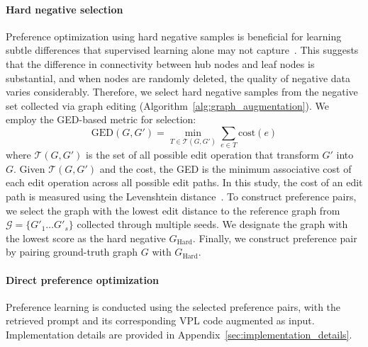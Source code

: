 \paragraph{Hard negative selection}
Preference optimization using hard negative samples is beneficial for learning subtle differences that supervised learning alone may not capture~\cite{zhu2024selfsupervised, chen2024on}.
This suggests that the difference in connectivity between hub nodes and leaf nodes is substantial, and when nodes are randomly deleted, the quality of negative data varies considerably.
Therefore, we select hard negative samples from the negative set collected via graph editing (Algorithm~\ref{alg:graph_augmentation}). We employ the GED-based metric for selection:
\begin{equation}
    \text{GED}(G,G')=\min_{T\in\mathcal{T}(G,G')}\sum\limits_{e \in T}\text{cost}(e)
\end{equation}
where $\mathcal{T}(G,G')$ is the set of all possible edit operation that transform $G'$ into $G$. Given $\mathcal{T}(G,G')$ and the cost, the GED is the minimum associative cost of each edit operation across all possible edit paths. In this study, the cost of an edit path is measured using the Levenshtein distance~\citep{black1998dictionary}. To construct preference pairs, we select the graph with the lowest edit distance to the reference graph from $\mathcal{G}=\{G'_1\dots G'_s\}$ collected through multiple seeds. We designate the graph with the lowest score as the hard negative $G_{\text{Hard}}$. Finally, we construct preference pair by pairing ground-truth graph $G$ with $G_{\text{Hard}}$. 

\paragraph{Direct preference optimization}
Preference learning is conducted using the selected preference pairs, with the retrieved prompt and its corresponding VPL code augmented as input. Implementation details are provided in Appendix~\ref{sec:implementation_details}.